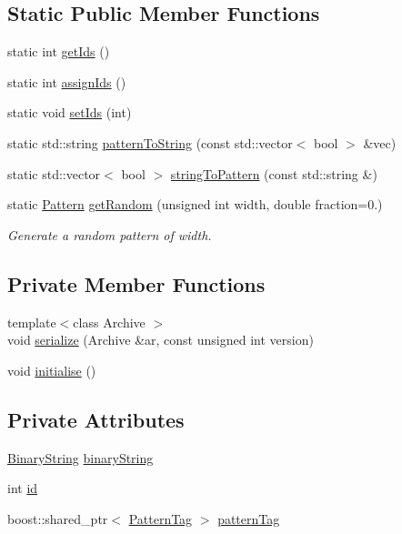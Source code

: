 \subsection*{\-Static \-Public \-Member \-Functions}
\begin{DoxyCompactItemize}
\item 
static int \hyperlink{classcryomesh_1_1state_1_1Pattern_aaf0fef8e434a2bf4e2a3de2146506e55}{get\-Ids} ()
\item 
static int \hyperlink{classcryomesh_1_1state_1_1Pattern_a02fe1e3bc02dad188199408748aa8e76}{assign\-Ids} ()
\item 
static void \hyperlink{classcryomesh_1_1state_1_1Pattern_abe885f1239abb58a449d945d02513599}{set\-Ids} (int)
\item 
static std\-::string \hyperlink{classcryomesh_1_1state_1_1Pattern_a8b72b4b8c76445cf788129ed5b6b42a5}{pattern\-To\-String} (const std\-::vector$<$ bool $>$ \&vec)
\item 
static std\-::vector$<$ bool $>$ \hyperlink{classcryomesh_1_1state_1_1Pattern_a30238bc06f4cbf29d28adff1fd09b280}{string\-To\-Pattern} (const std\-::string \&)
\item 
static \hyperlink{classcryomesh_1_1state_1_1Pattern}{\-Pattern} \hyperlink{classcryomesh_1_1state_1_1Pattern_ad253bf9c3cb1997ce2f8db2ded5455ba}{get\-Random} (unsigned int width, double fraction=0.)
\begin{DoxyCompactList}\small\item\em \-Generate a random pattern of width. \end{DoxyCompactList}\end{DoxyCompactItemize}
\subsection*{\-Private \-Member \-Functions}
\begin{DoxyCompactItemize}
\item 
{\footnotesize template$<$class Archive $>$ }\\void \hyperlink{classcryomesh_1_1state_1_1Pattern_afe08a220604e76d3f01156783303eee6}{serialize} (\-Archive \&ar, const unsigned int version)
\item 
void \hyperlink{classcryomesh_1_1state_1_1Pattern_a5488a0554ecbcf4749ce79f5523972d9}{initialise} ()
\end{DoxyCompactItemize}
\subsection*{\-Private \-Attributes}
\begin{DoxyCompactItemize}
\item 
\hyperlink{classcryomesh_1_1state_1_1BinaryString}{\-Binary\-String} \hyperlink{classcryomesh_1_1state_1_1Pattern_a2ceffaffb21669b4712f9af5f5045e6e}{binary\-String}
\item 
int \hyperlink{classcryomesh_1_1state_1_1Pattern_aa8070cf7c7e5621164fcf389baeec552}{id}
\item 
boost\-::shared\-\_\-ptr$<$ \hyperlink{classcryomesh_1_1state_1_1PatternTag}{\-Pattern\-Tag} $>$ \hyperlink{classcryomesh_1_1state_1_1Pattern_ae6138b7407f2e55de84a1c53fcc14a35}{pattern\-Tag}
\end{DoxyCompactItemize}
